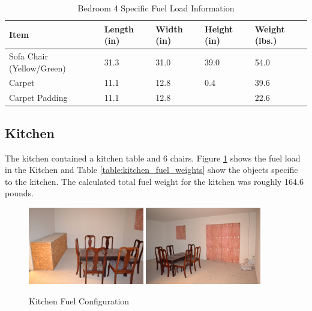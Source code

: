 \documentclass[12pt,oneside]{book}
\begin{document}
\begin{table}[H]
\centering
\begin{tabular}{|L{0.3\textwidth}|C{0.08\textwidth}|C{0.08\textwidth}|C{0.08\textwidth}|C{0.08\textwidth}|}
\hline
Item 						&Length (in) 	&Width (in) 	&Height (in) 	&Weight (lbs.) 	\\ \hline \hline
Sofa Chair (Yellow/Green) 	&31.3 			&31.0 			&39.0 			&54.0 			\\ \hline
Carpet 						&11.1			&12.8			&0.4			&39.6			\\ \hline
Carpet Padding 				&11.1			&12.8			&				&22.6			\\ \hline	 
\end{tabular}
\caption{Bedroom 4 Specific Fuel Load Information}
\label{table:b4_fuel_weights}
\end{table}

\clearpage

\subsection*{Kitchen}
The kitchen contained a kitchen table and 6 chairs. Figure \ref{figure:Kitchen_fuel} shows the fuel load in the Kitchen and Table \ref{table:kitchen_fuel_weights} show the objects specific to the kitchen. The calculated total fuel weight for the kitchen was roughly 164.6 pounds. 

\begin{figure}[H]
\centering
\includegraphics[width=0.45\textwidth]{../0_Images/Fuel/Kitchen.jpg}
\includegraphics[width=0.45\textwidth]{../0_Images/Fuel/Dining_Room.jpg}
\caption{Kitchen Fuel Configuration}
\label{figure:Kitchen_fuel}
\end{figure}
\end{document}

